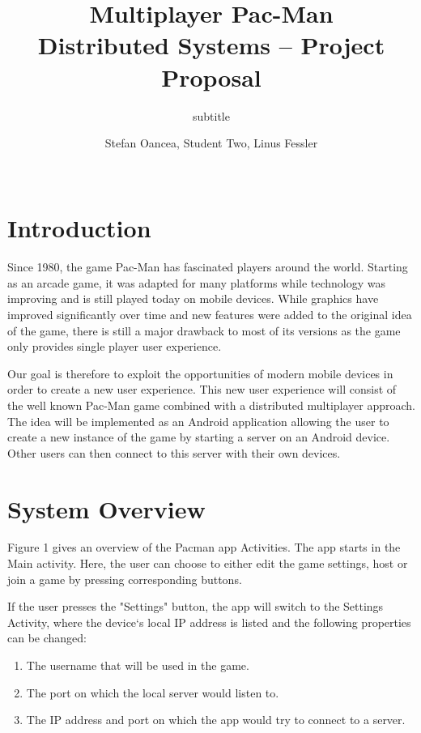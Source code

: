 \documentclass{report}
\title{Multiplayer Pac-Man\\
\normalsize{Distributed Systems -- Project Proposal}}
\subtitle{subtitle}
\author{
%
%
\alignauthor \normalsize{Stefan Oancea,  Student Two, Linus Fessler}\\
	\affaddr{\normalsize{ETH ID-1 14-944-912, ETH ID-2 14-931-968, ETH ID-3 14-924-203}}\\
	\email{\normalsize{oanceas@student.ethz.ch, fmorath@student.ethz.ch, fesslerl@student.ethz.ch}}
}
\begin{document}
\maketitle

\section{Introduction}


Since 1980, the game Pac-Man has fascinated players around the world. 
Starting as an arcade game, it was adapted for many platforms while technology was improving and is still played today on mobile devices.
While graphics have improved significantly over time and new features were added to the original idea of the game, there is still a major drawback to most of its versions as the game only provides single player user experience.

 
Our goal is therefore to exploit the opportunities of modern mobile devices in order to create a new user experience. 
This new user experience will consist of the well known Pac-Man game combined with a distributed multiplayer approach.
The idea will be implemented as an Android application allowing the user to create a new instance of the game by starting a server on an Android device. 
Other users can then connect to this server with their own devices.



\section{System Overview}

Figure 1 gives an overview of the Pacman app Activities.
The app starts in the Main activity. 
Here, the user can choose to either edit the game settings, host or join a game by pressing corresponding buttons.

If the user presses the "Settings" button, the app will switch to the Settings Activity, where the device`s local IP address is listed and the following properties can be changed:
\begin{enumerate}
	\item The username that will be used in the game.
	\item The port on which the local server would listen to.
	\item The IP address and port on which the app would try to connect to a server.
\end{enumerate}
\end{document}
